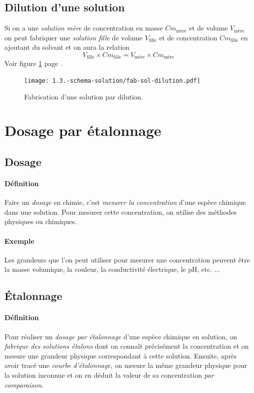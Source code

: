 \subsection{Dilution d'une solution}
Si on a une \textit{solution mère} de concentration en masse $Cm_{\text{mère}}$
et de volume $V_\text{mère}$ on peut fabriquer une \textit{solution fille} de volume
$V_\text{fille}$ et de concentration $Cm_\text{fille}$ en ajoutant du solvant et on aura la relation $$ V_\text{fille} \times Cm_\text{fille} = V_\text{mère} \times Cm_\text{mère}$$
Voir figure \ref{fig:fab-sol-dilution} page \pageref{fig:fab-sol-dilution}.

\begin{figure}[h!]
  \begin{center}
      \texttt{[image: 1.3.-schema-solution/fab-sol-dilution.pdf]}
  \end{center}
  \caption{Fabrication d'une solution par dilution.}
  \label{fig:fab-sol-dilution}
\end{figure}


\section{Dosage par étalonnage}
\subsection{Dosage}
\paragraph{Définition}
Faire un \textit{dosage} en chimie, c'est \textit{mesurer la
concentration} d'une espèce chimique dans une solution. Pour mesurer 
cette concentration, on utilise des méthodes physiques ou chimiques.
\paragraph{Exemple} Les grandeurs que l'on peut utiliser pour mesurer
une concentration peuvent être la masse volumique, la couleur, la conductivité
électrique, le pH, etc. ...

\subsection{Étalonnage}
\paragraph{Définition}
Pour réaliser un \textit{dosage par étalonnage} d'une espèce chimique en solution, on \textit{fabrique
des solutions étalons} dont on connaît précisément la concentration et on mesure une grandeur
physique correspondant à cette solution. Ensuite, après avoir tracé une \textit{courbe 
d'étalonnage}, on mesure la même grandeur physique pour la solution inconnue et on en déduit 
la valeur de sa concentration \textit{par comparaison}.
